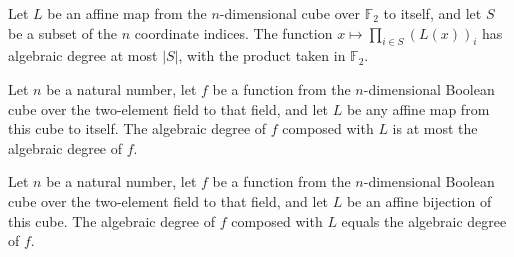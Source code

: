 \begin{theorem}
\label{FABL.functionAlgebraicDegree_anfMonomial_comp_affineMap_le_card}
\leanok
{}
Let $L$ be an affine map from the $n$-dimensional cube over $\mathbb{F}_2$ to itself,
and let $S$ be a subset of the $n$ coordinate indices. The function $x\mapsto\prod_{i\in
S}(L(x))_i$ has algebraic degree at most $|S|$, with the product taken in
$\mathbb{F}_2$.
\end{theorem}

\begin{theorem}
\label{FABL.functionAlgebraicDegree_comp_affineMap_le}
\leanok
{}
Let $n$ be a natural number, let $f$ be a function from the $n$-dimensional Boolean cube
over the two-element field to that field, and let $L$ be any affine map from this cube
to itself. The algebraic degree of $f$ composed with $L$ is at most the algebraic degree
of $f$.
\end{theorem}

\begin{theorem}
\label{FABL.functionAlgebraicDegree_comp_affineEquiv}
\leanok
{}
Let $n$ be a natural number, let $f$ be a function from the $n$-dimensional Boolean cube
over the two-element field to that field, and let $L$ be an affine bijection of this
cube. The algebraic degree of $f$ composed with $L$ equals the algebraic degree of $f$.
\end{theorem}
